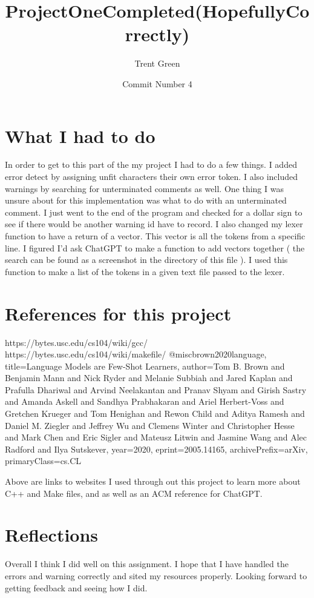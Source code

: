 \documentclass{article}
\title{ProjectOneCompleted(HopefullyCorrectly)}
\author{Trent Green}
\date{Commit Number 4}
\begin{document}
\maketitle

\section{What I had to do}
In order to get to this part of the my project I had to do a few things. I added error detect by assigning unfit characters their own error token. I also included warnings by searching for unterminated comments as well. One thing I was unsure about for this implementation was what to do with an unterminated comment. I just went to the end of the program and checked for a dollar sign to see if there would be another warning id have to record. I also changed my lexer function to have a return of a vector. This vector is all the tokens from a specific line. I figured I'd ask ChatGPT to make a function to add vectors together ( the search can be found as a screenshot in the directory of this file ). I used this function to make a list of the tokens in a given text file passed to the lexer.

\section{References for this project}
https://bytes.usc.edu/cs104/wiki/gcc/ https://bytes.usc.edu/cs104/wiki/makefile/ @misc{brown2020language, title={Language Models are Few-Shot Learners}, author={Tom B. Brown and Benjamin Mann and Nick Ryder and Melanie Subbiah and Jared Kaplan and Prafulla Dhariwal and Arvind Neelakantan and Pranav Shyam and Girish Sastry and Amanda Askell and Sandhya Prabhakaran and Ariel Herbert-Voss and Gretchen Krueger and Tom Henighan and Rewon Child and Aditya Ramesh and Daniel M. Ziegler and Jeffrey Wu and Clemens Winter and Christopher Hesse and Mark Chen and Eric Sigler and Mateusz Litwin and Jasmine Wang and Alec Radford and Ilya Sutskever}, year={2020}, eprint={2005.14165}, archivePrefix={arXiv}, primaryClass={cs.CL} }

Above are links to websites I used through out this project to learn more about C++ and Make files, and as well as an ACM reference for ChatGPT.

\section{Reflections}
Overall I think I did well on this assignment. I hope that I have handled the errors and warning correctly and sited my resources properly. Looking forward to getting feedback and seeing how I did. 
\end{document}
